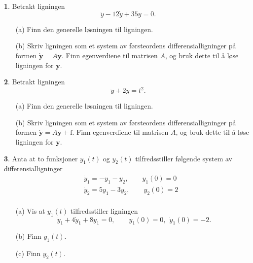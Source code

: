 \documentclass{article}
\theoremstyle{definition}
\newtheorem{oppg}{}
\theoremstyle{remark}
\begin{document}
\begin{multicols*}{2}
\begin{oppg}  
  Betrakt ligningen
  \begin{equation*}
    \ddot{y} - 12\dot{y} + 35y = 0.
  \end{equation*}
  \begin{itemize}
    \item[(a)] Finn den generelle løsningen til ligningen.
    \item[(b)] Skriv ligningen som et system av førsteordens differensialligninger på formen $\dot{\boldsymbol{y}}= A\boldsymbol{y}$. Finn egenverdiene til matrisen $A$, og bruk dette til å løse ligningen for $\boldsymbol{y}$.
  \end{itemize}
\end{oppg}

\begin{oppg}  
  Betrakt ligningen
  \begin{equation*}
    \ddot{y} + 2y = t^2.
  \end{equation*}
  \begin{itemize}
    \item[(a)] Finn den generelle løsningen til ligningen.
    \item[(b)] Skriv ligningen som et system av førsteordens differensialligninger på formen $\dot{\boldsymbol{y}}= A\boldsymbol{y} + \boldsymbol{\mathrm{f}}$. Finn egenverdiene til matrisen $A$, og bruk dette til å løse ligningen for $\boldsymbol{y}$.
  \end{itemize}
\end{oppg}

\begin{oppg}  
  Anta at to funksjoner $y_1(t)$ og $y_2(t)$ tilfredsstiller følgende system av differensialligninger
  \begin{equation*}
    \begin{split}
      & \dot{y}_1 = - y_1 - y_2, \qquad y_1(0) = 0\\
      & \dot{y}_2 = 5y_1 - 3y_2, \qquad y_2(0) = 2\\
    \end{split}
  \end{equation*}
  \begin{itemize}
    \item[(a)] Vis at $y_1(t)$ tilfredsstiller ligningen
    \begin{equation*}
      \ddot{y}_1 + 4\dot{y}_1 + 8y_1 = 0, \qquad y_1(0) = 0,\ \ \dot{y}_1(0) = -2.
    \end{equation*}
    \item[(b)] Finn $y_1(t)$.
    \item[(c)] Finn $y_2(t)$.
  \end{itemize}
\end{oppg}


\end{multicols*}
\end{document}
